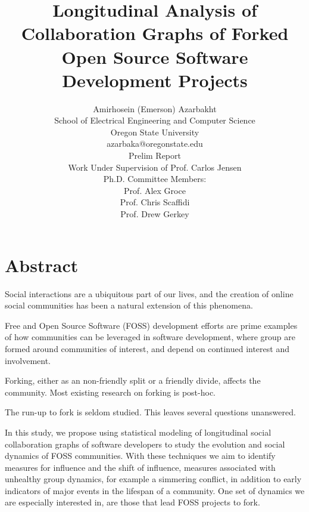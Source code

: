 \documentclass[11pt]{report}
\begin{document}
\title{Longitudinal Analysis of Collaboration Graphs of Forked Open Source Software Development Projects}

\author{Amirhosein (Emerson) Azarbakht\\
School of Electrical Engineering and Computer Science\\
Oregon State University\\
\vspace{5mm} %
azarbaka@oregonstate.edu\\
\vspace{5mm} %
Prelim Report\\
Work Under Supervision of Prof. Carlos Jensen\\
Ph.D. Committee Members:\\
Prof. Alex Groce\\
Prof. Chris Scaffidi\\
Prof. Drew Gerkey\\
}

\maketitle

\tableofcontents

\thispagestyle{empty}
\listoffigures
\listoftables

\pagebreak

\section{Abstract}



Social interactions are a ubiquitous part of our lives, and the creation of online social communities has been a natural extension of this phenomena.

Free and Open Source Software (FOSS) development efforts are prime examples of how communities can be leveraged in software development, where group are formed around communities of interest, and depend on continued interest and involvement. 

Forking, either as an non-friendly split or a friendly divide, affects the community. Most existing research on forking is post-hoc. 

The run-up to fork is seldom studied. This leaves several questions unanswered. 

In this study, we propose using statistical modeling of longitudinal social collaboration graphs of software developers to study the evolution and social dynamics of FOSS communities. With these techniques we aim to identify measures for influence and the shift of influence, measures associated with unhealthy group dynamics, for example a simmering conflict, in addition to early indicators of major events in the lifespan of a community. One set of dynamics we are especially interested in, are those that lead FOSS projects to fork. 
\end{document}
